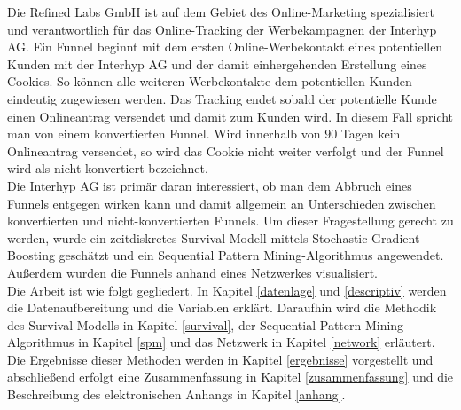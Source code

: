 Die Refined Labs GmbH ist auf dem Gebiet des Online-Marketing spezialisiert und verantwortlich für das Online-Tracking der Werbekampagnen der Interhyp AG. Ein Funnel beginnt mit dem ersten Online-Werbekontakt eines potentiellen Kunden mit der Interhyp AG und der damit einhergehenden Erstellung eines Cookies. So können alle weiteren Werbekontakte dem potentiellen Kunden eindeutig zugewiesen werden. Das Tracking endet sobald der potentielle Kunde einen Onlineantrag versendet und damit zum Kunden wird. In diesem Fall spricht man von einem konvertierten Funnel. Wird innerhalb von $90$ Tagen kein Onlineantrag versendet, so wird das Cookie nicht weiter verfolgt und der Funnel wird als nicht-konvertiert bezeichnet.\\
Die Interhyp AG ist primär daran interessiert, ob man dem Abbruch eines Funnels entgegen wirken kann und damit allgemein an Unterschieden zwischen konvertierten und nicht-konvertierten Funnels. Um dieser Fragestellung gerecht zu werden, wurde ein zeitdiskretes Survival-Modell mittels Stochastic Gradient Boosting geschätzt und ein Sequential Pattern Mining-Algorithmus angewendet. Außerdem wurden die Funnels anhand eines Netzwerkes visualisiert.\\
Die Arbeit ist wie folgt gegliedert. In Kapitel \ref{datenlage} und \ref{descriptiv} werden die Datenaufbereitung und die Variablen erklärt. Daraufhin wird die Methodik des Survival-Modells in Kapitel \ref{survival}, der Sequential Pattern Mining-Algorithmus in Kapitel \ref{spm} und das Netzwerk in Kapitel \ref{network} erläutert. Die Ergebnisse dieser Methoden werden in Kapitel \ref{ergebnisse} vorgestellt und abschließend erfolgt eine Zusammenfassung in Kapitel \ref{zusammenfassung} und die Beschreibung des elektronischen Anhangs in Kapitel \ref{anhang}.